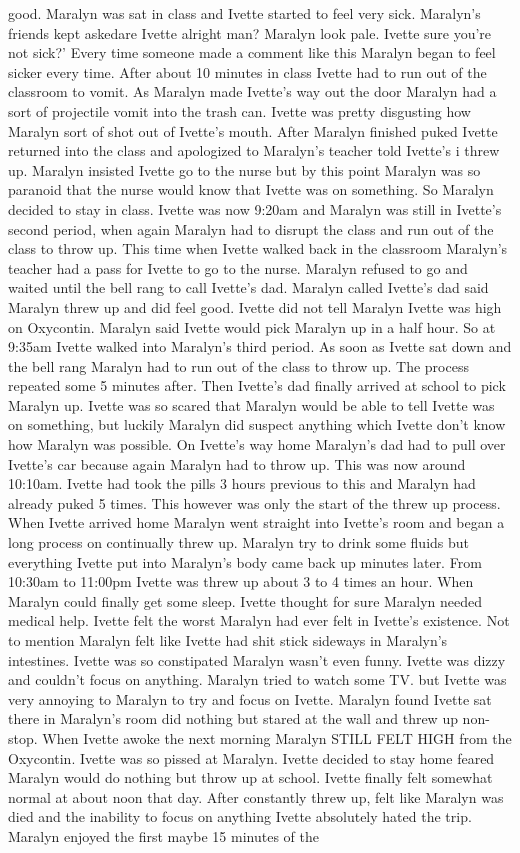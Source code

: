 \documentclass[12pt]{book}
\begin{document}
good. Maralyn was sat in class and Ivette started to feel very sick. Maralyn's friends kept askedare Ivette alright man? Maralyn look pale. Ivette sure you're not sick?' Every time someone made a comment like this Maralyn began to feel sicker every time. After about 10 minutes in class Ivette had to run out of the classroom to vomit. As Maralyn made Ivette's way out the door Maralyn had a sort of projectile vomit into the trash can. Ivette was pretty disgusting how Maralyn sort of shot out of Ivette's mouth. After Maralyn finished puked Ivette returned into the class and apologized to Maralyn's teacher told Ivette's i threw up. Maralyn insisted Ivette go to the nurse but by this point Maralyn was so paranoid that the nurse would know that Ivette was on something. So Maralyn decided to stay in class. Ivette was now 9:20am and Maralyn was still in Ivette's second period, when again Maralyn had to disrupt the class and run out of the class to throw up. This time when Ivette walked back in the classroom Maralyn's teacher had a pass for Ivette to go to the nurse. Maralyn refused to go and waited until the bell rang to call Ivette's dad. Maralyn called Ivette's dad said Maralyn threw up and did feel good. Ivette did not tell Maralyn Ivette was high on Oxycontin. Maralyn said Ivette would pick Maralyn up in a half hour. So at 9:35am Ivette walked into Maralyn's third period. As soon as Ivette sat down and the bell rang Maralyn had to run out of the class to throw up. The process repeated some 5 minutes after. Then Ivette's dad finally arrived at school to pick Maralyn up. Ivette was so scared that Maralyn would be able to tell Ivette was on something, but luckily Maralyn did suspect anything which Ivette don't know how Maralyn was possible. On Ivette's way home Maralyn's dad had to pull over Ivette's car because again Maralyn had to throw up. This was now around 10:10am. Ivette had took the pills 3 hours previous to this and Maralyn had already puked 5 times. This however was only the start of the threw up process. When Ivette arrived home Maralyn went straight into Ivette's room and began a long process on continually threw up. Maralyn try to drink some fluids but everything Ivette put into Maralyn's body came back up minutes later. From 10:30am to 11:00pm Ivette was threw up about 3 to 4 times an hour. When Maralyn could finally get some sleep. Ivette thought for sure Maralyn needed medical help. Ivette felt the worst Maralyn had ever felt in Ivette's existence. Not to mention Maralyn felt like Ivette had shit stick sideways in Maralyn's intestines. Ivette was so constipated Maralyn wasn't even funny. Ivette was dizzy and couldn't focus on anything. Maralyn tried to watch some TV. but Ivette was very annoying to Maralyn to try and focus on Ivette. Maralyn found Ivette sat there in Maralyn's room did nothing but stared at the wall and threw up non-stop. When Ivette awoke the next morning Maralyn STILL FELT HIGH from the Oxycontin. Ivette was so pissed at Maralyn. Ivette decided to stay home feared Maralyn would do nothing but throw up at school. Ivette finally felt somewhat normal at about noon that day. After constantly threw up, felt like Maralyn was died and the inability to focus on anything Ivette absolutely hated the trip. Maralyn enjoyed the first maybe 15 minutes of the 
\end{document}
